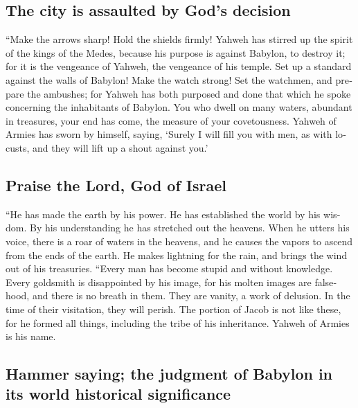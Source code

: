 \begin{paracol}{2}
\begin{otherlanguage}{english}
\hypertarget{the-city-is-assaulted-by-gods-decision}{%
\subsection{The city is assaulted by God's
decision}\label{the-city-is-assaulted-by-gods-decision}}

 ``Make the arrows sharp! Hold the shields firmly! Yahweh
has stirred up the spirit of the kings of the Medes, because his purpose
is against Babylon, to destroy it; for it is the vengeance of Yahweh,
the vengeance of his temple.  Set up a standard against
the walls of Babylon! Make the watch strong! Set the watchmen, and
prepare the ambushes; for Yahweh has both purposed and done that which
he spoke concerning the inhabitants of Babylon.  You who
dwell on many waters, abundant in treasures, your end has come, the
measure of your covetousness.  Yahweh of Armies has sworn
by himself, saying, `Surely I will fill you with men, as with locusts,
and they will lift up a shout against you.'

\hypertarget{praise-the-lord-god-of-israel}{%
\subsection{Praise the Lord, God of
Israel}\label{praise-the-lord-god-of-israel}}

 ``He has made the earth by his power. He has established
the world by his wisdom. By his understanding he has stretched out the
heavens.  When he utters his voice, there is a roar of
waters in the heavens, and he causes the vapors to ascend from the ends
of the earth. He makes lightning for the rain, and brings the wind out
of his treasuries.  ``Every man has become stupid and
without knowledge. Every goldsmith is disappointed by his image, for his
molten images are falsehood, and there is no breath in them.
 They are vanity, a work of delusion. In the time of
their visitation, they will perish.  The portion of Jacob
is not like these, for he formed all things, including the tribe of his
inheritance. Yahweh of Armies is his name.

\hypertarget{hammer-saying-the-judgment-of-babylon-in-its-world-historical-significance}{%
\subsection{Hammer saying; the judgment of Babylon in its world
historical
significance}\label{hammer-saying-the-judgment-of-babylon-in-its-world-historical-significance}}


\end{otherlanguage}
\end{paracol}
